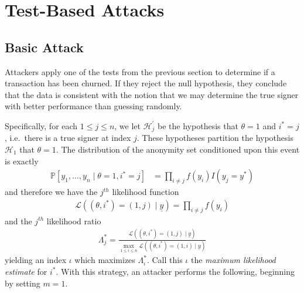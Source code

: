 \documentclass{tran-l}
\theoremstyle{cor}
\theoremstyle{definition}
\theoremstyle{remark}
\theoremstyle{conjecture}
\numberwithin{equation}{section}
\begin{document}
\section{Test-Based Attacks}\label{sec:test_attack}

\subsection{Basic Attack}

Attackers apply one of the tests from the previous section to determine if a transaction has been churned.
If they reject the null hypothesis, they conclude that the data is consistent with the notion that we may determine the true signer with better performance than guessing randomly.

Specifically, for each $1 \leq j \leq n$, we let $\mathcal{H}_j^\prime$ be the hypothesis that $\theta = 1$ and $i^* = j$, i.e.\ there is a true signer at index $j$.
These hypotheses partition the hypothesis $\mathcal{H}_1$ that $\theta = 1$.
The distribution of the anonymity set conditioned upon this event is exactly
\begin{align}
\mathbb{P}[y_1, \ldots, y_n \mid \theta=1, i^*=j] &= \prod_{i \neq j} f(y_i) I(y_j = y^*)
\end{align}
and therefore we have the $j^{th}$ likelihood function
\begin{align}
\mathcal{L}((\theta,i^*)=(1,j) \mid \underline{y}) = \prod_{i \neq j} f(y_i)
\end{align}
and the $j^{th}$ likelihood ratio
\begin{align}
\Lambda^*_j = \frac{\mathcal{L}((\theta,i^*)=(1,j) \mid \underline{y})}{\max_{1 \leq i \leq n} \mathcal{L}((\theta,i^*)=(1,i) \mid \underline{y})}
\end{align}
yielding an index $\iota$ which maximizes $\Lambda^*_\iota$.
Call this $\iota$ the \textit{maximum likelihood estimate} for $i^*$.
With this strategy, an attacker performs the following, beginning by setting $m = 1$.
\end{document}
